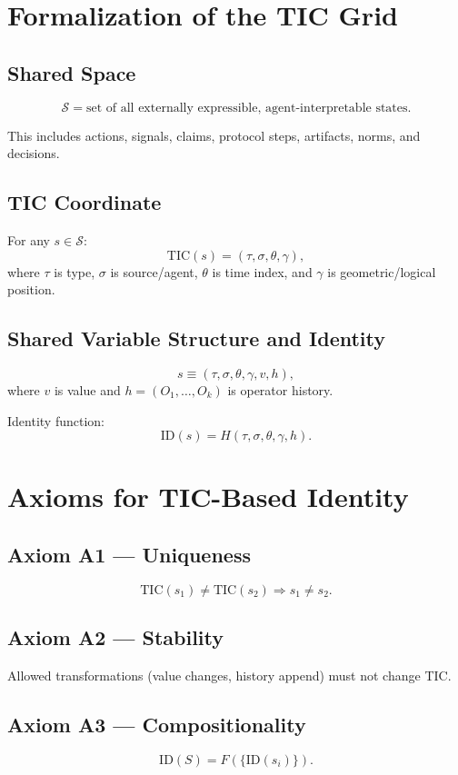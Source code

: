 \documentclass[11pt]{article}
\begin{document}
\section{Formalization of the TIC Grid}

\subsection{Shared Space}

\[
\mathcal{S} = \text{set of all externally expressible, agent-interpretable states}.
\]

This includes actions, signals, claims, protocol steps, artifacts, norms, and decisions.

\subsection{TIC Coordinate}

For any $s \in \mathcal{S}$:
\[
\text{TIC}(s) = (\tau, \sigma, \theta, \gamma),
\]
where $\tau$ is type, $\sigma$ is source/agent, $\theta$ is time index, and $\gamma$ is geometric/logical position.

\subsection{Shared Variable Structure and Identity}

\[
s \equiv (\tau, \sigma, \theta, \gamma, v, h),
\]
where $v$ is value and $h = (O_1, \dots, O_k)$ is operator history.

Identity function:
\[
\mathrm{ID}(s) = H(\tau, \sigma, \theta, \gamma, h).
\]

\section{Axioms for TIC-Based Identity}

\subsection*{Axiom A1 --- Uniqueness}
\[
\text{TIC}(s_1) \neq \text{TIC}(s_2) \Rightarrow s_1 \neq s_2.
\]

\subsection*{Axiom A2 --- Stability}
Allowed transformations (value changes, history append) must not change TIC.

\subsection*{Axiom A3 --- Compositionality}
\[
\mathrm{ID}(S) = F(\{\mathrm{ID}(s_i)\}).
\]
\end{document}
